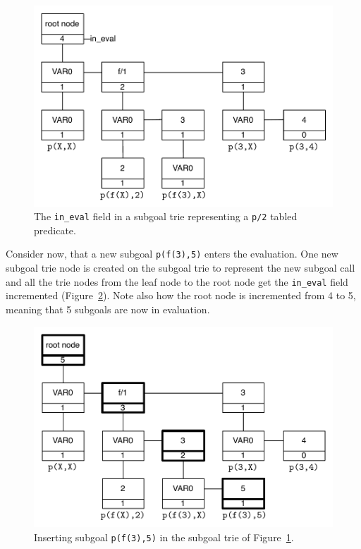 \begin{figure}[ht]
\centering
\includegraphics[scale=0.6]{in_eval_trie}
\caption{The \texttt{in\_eval} field in a subgoal trie representing a \texttt{p/2}
  tabled predicate.}
\label{fig:in_eval_trie}
\end{figure}

Consider now, that a new subgoal \texttt{p(f(3),5)} enters the
evaluation. One new subgoal trie node is created on the subgoal trie
to represent the new subgoal call and all the trie nodes from the leaf
node to the root node get the \texttt{in\_eval} field incremented
(Figure~\ref{fig:in_eval_add}). Note also how the root node is
incremented from 4 to 5, meaning that 5 subgoals are now in
evaluation.

\begin{figure}[ht]
\centering
\includegraphics[scale=0.6]{in_eval_add}
\caption{Inserting subgoal \texttt{p(f(3),5)} in the subgoal trie of
  Figure~\ref{fig:in_eval_trie}.}
\label{fig:in_eval_add}
\end{figure}


